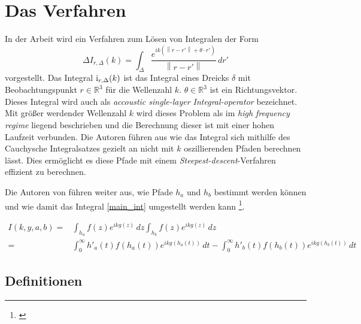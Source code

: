 \chapter{Das Verfahren}\label{algo}


In der Arbeit  wird ein Verfahren zum Lösen von Integralen der Form
\begin{equation}
    \Delta
    I_{r,\Delta}(k) = \int_{\Delta}^{}  \frac{e^{ik(\left\lVert r-r'\right\rVert + \theta \cdot r')}}{\left\lVert r-r'\right\rVert} \,dr'
\end{equation}\label{main_int}
vorgestellt. Das Integral ${\rm i}_{r,\Delta}(k)$ ist das Integral eines Dreicks $\delta$ mit Beobachtungspunkt $r \in \mathbb{R}^3$ für die Wellenzahl $k$. $\theta \in \mathbb{R}^3$ ist ein Richtungsvektor.
Dieses Integral wird auch als \textit{accoustic single-layer Integral-operator} bezeichnet.
Mit größer werdender Wellenzahl $k$ wird dieses Problem als im \textit{high frequency regime} liegend beschrieben und die Berechnung dieser ist mit einer hohen Laufzeit verbunden.
Die Autoren führen aus wie das Integral sich mithilfe des Cauchysche Integralsatzes gezielt an nicht mit $k$ oszillierenden Pfaden berechnen lässt.
Dies ermöglicht es diese Pfade mit einem \textit{Steepest-descent}-Verfahren effizient zu berechnen.

Die Autoren von \cite{gasperini:hal-03209144} führen weiter aus, wie Pfade $h_a$ und $h_b$ bestimmt werden können und
 wie damit das Integral \ref{main_int} umgestellt werden kann \footnote{\cite[Kaptiel 1, Gleichung 4]{gasperini:hal-03209144}}.

\begin{equation}
    \begin{aligned}
        I(k,y,a,b) = & \int_{h_a}^{} f(z) e^{ikg(z)} \,dz  \int_{h_b}^{} f(z) e^{ikg(z)} \,dz \\
         = & \int_{0}^{\infty} h'_a(t)f(h_a(t))e^{ikg(h_a(t))} \,dt -\int_{0}^{\infty} h'_b(t)f(h_b(t))e^{ikg(h_b(t))} \,dt 
    \end{aligned}
\end{equation}

\section{Definitionen}

